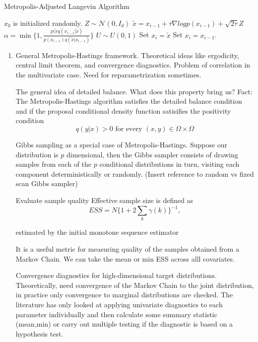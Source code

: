 \documentclass{book}
\begin{document}
\begin{algorithm}
\caption{Metropolis-Adjusted Langevin Algorithm}
\State $x_0$ is initialized randomly.
\State $Z \sim \mathcal{N}(0, I_d) $
\State $\tilde{x}= x_{i-1} + \tau \nabla log p(x_{i-1}) + \sqrt{2 \tau} Z$
\State $\alpha = \min\{1, \frac{p(\tilde{x} q(x_{i-1}|\tilde{x})}{p(x_{i-1})q(\tilde{x}|x_{i-1})}\} $
\State $U \sim U(0,1)$
 \State Set $x_i = \tilde{x}$
\Else{}
 \State Set $x_i = x_{i-1}$.
\EndIf
\EndFor
\EnfFunction
\end{algorithm}
\begin{enumerate} 


\item General Metropolis-Hastings framework. Theoretical ideas like ergodicity, central limit theorem, and convergence diagnostics. Problem of correlation in the multivariate case. Need for reparametrization sometimes.

The general idea of detailed balance. What does this property bring us? 
Fact:
The Metropolis-Hastings algorithm satisfies the detailed balance condition and
if the proposal conditional density function satisifies the positivity condition
\[ q(y|x) > 0 \text{ for every } (x,y) \in \Omega \times \Omega \]


Gibbs sampling as a special case of Metropolis-Hastings.
Suppose our distribution is $p$ dimensional, then the Gibbs sampler consists
of drawing samples from each of the $p$ conditional distributions in turn,
visiting each component deterministically or randomly. (Insert reference to
random vs fixed scan Gibbs sampler)

Evaluate sample quality
Effective sample size is defined as 
\[ ESS = N \{ 1 + 2 \sum_k \gamma(k) \}^{-1}, \]

estimated by the initial
monotone sequence estimator \cite{geyer1992practical}

It is a useful metric for measuring quality of the samples obtained from a Markov Chain. We can take the mean or min ESS across alll covariates.

Convergence diagnostics for high-dimensional target distributions. Theoretically, need convergence of the Markov Chain to the joint distribution, in practice only convergence to marginal distributions are checked. The literature has only looked at applying univariate diagnostics to each parameter individually and then calculate some summary statistic (mean,min) or carry out multiple testing if the diagnostic is based on a hypothesis test.


\end{enumerate}
\end{document}
